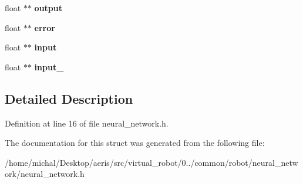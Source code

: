 \begin{DoxyCompactItemize}
\item 
\hypertarget{structsNeuralNetwork_ad67a1b3c839c54b84e124c8fe2833139}{float $\ast$$\ast$ {\bfseries output}}\label{structsNeuralNetwork_ad67a1b3c839c54b84e124c8fe2833139}

\item 
\hypertarget{structsNeuralNetwork_a460d9fac83d0bcd64f9cd7aa5a84c591}{float $\ast$$\ast$ {\bfseries error}}\label{structsNeuralNetwork_a460d9fac83d0bcd64f9cd7aa5a84c591}

\item 
\hypertarget{structsNeuralNetwork_afef1fcb46cc11082d1f872f1326fafcb}{float $\ast$$\ast$ {\bfseries input}}\label{structsNeuralNetwork_afef1fcb46cc11082d1f872f1326fafcb}

\item 
\hypertarget{structsNeuralNetwork_af7c1f10e277310626387499c80917fcd}{float $\ast$$\ast$ {\bfseries input\-\_\-}}\label{structsNeuralNetwork_af7c1f10e277310626387499c80917fcd}

\end{DoxyCompactItemize}


\subsection{Detailed Description}


Definition at line 16 of file neural\-\_\-network.\-h.



The documentation for this struct was generated from the following file\-:\begin{DoxyCompactItemize}
\item 
/home/michal/\-Desktop/aeris/src/virtual\-\_\-robot/0../common/robot/neural\-\_\-network/neural\-\_\-network.\-h\end{DoxyCompactItemize}
